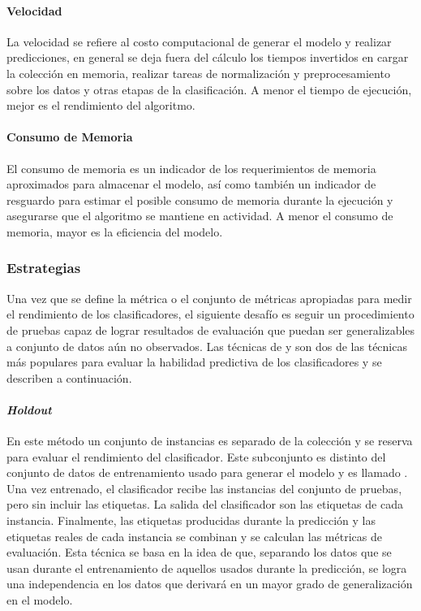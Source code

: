 \paragraph{Velocidad}

La velocidad se refiere al costo computacional de generar el modelo y realizar
predicciones, en general se deja fuera del cálculo los tiempos invertidos en
cargar la colección en memoria, realizar tareas de normalización y
preprocesamiento sobre los datos y otras etapas de la clasificación. A menor el
tiempo de ejecución, mejor es el rendimiento del algoritmo.

\paragraph{Consumo de Memoria}

El consumo de memoria es un indicador de los requerimientos de memoria
aproximados para almacenar el modelo, así como también un indicador de resguardo
para estimar el posible consumo de memoria durante la ejecución y asegurarse que
el algoritmo se mantiene en actividad. A menor el consumo de memoria, mayor es
la eficiencia del modelo.

\subsubsection{Estrategias}
\label{evaluacion_estrategias}

Una vez que se define la métrica o el conjunto de métricas apropiadas para
medir el rendimiento de los clasificadores, el siguiente desafío es seguir un
procedimiento de pruebas capaz de lograr resultados de evaluación que puedan ser
generalizables a conjunto de datos aún no observados. Las técnicas de
 y  son dos de las
técnicas más populares para evaluar la habilidad predictiva de los
clasificadores y se describen a continuación.


\paragraph{\textit{Holdout}}

En este método un conjunto de instancias es separado de la colección y se
reserva para evaluar el rendimiento del clasificador.  Este subconjunto es
distinto del conjunto de datos de entrenamiento usado para generar el modelo y
es llamado . Una vez entrenado,
el clasificador recibe las instancias del conjunto de pruebas, pero sin incluir
las etiquetas. La salida del clasificador son las etiquetas de cada instancia.
Finalmente, las etiquetas producidas durante la predicción y las etiquetas
reales de cada instancia se combinan y se calculan las métricas de evaluación.
Esta técnica se basa en la idea de que, separando los datos que se usan durante
el entrenamiento de aquellos usados durante la predicción, se logra una
independencia en los datos que derivará en un mayor grado de generalización en
el modelo.

